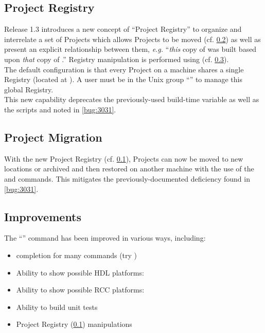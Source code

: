 \subsection{Project Registry} %
\label{sec:13_proj_registry}
Release 1.3 introduces a new concept of ``Project Registry'' to organize and interrelate a set of Projects which allows Projects to be moved (cf.  \ref{sec:13_proj_moved}) as well as present an explicit relationship between them, \textit{e.g.} ``\textit{this} copy of  was built based upon \textit{that} copy of .'' Registry manipulation is performed using \ocpidev (cf. \ref{sec:13_ocpidev}).\\

The default configuration is that every Project on a machine shares a single Registry (located at ). A user must be in the Unix group ``'' to manage this global Registry.\\

This new capability deprecates the previously-used  build-time variable as well as the scripts  and  noted in \ref{bug:3031}.

\subsection{Project Migration} %
\label{sec:13_proj_moved}
With the new Project Registry (cf. \ref{sec:13_proj_registry}), Projects can now be moved to new locations or archived and then restored on another machine with the use of the  and  commands. This mitigates the previously-documented deficiency found in \ref{bug:3031}.

\subsection{\ocpidev Improvements} %
\label{sec:13_ocpidev}
The ``\ocpidev'' command has been improved in various ways, including:
\begin{itemize}
\setlength\itemsep{0em} %
\item {} completion for many commands (try )
\item Ability to show possible HDL platforms: 
\item Ability to show possible RCC platforms: 
\item Ability to build unit tests
\item Project Registry (\ref{sec:13_proj_registry}) manipulations
\end{itemize}

